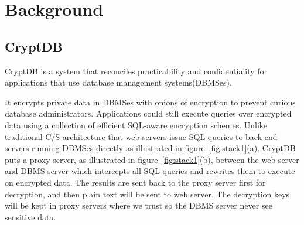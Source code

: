 \section{Background}

\subsection{CryptDB}\label{CryptDB}
CryptDB is a system that reconciles practicability and confidentiality for applications that use database management systems(DBMSes). 

It encrypts private data in DBMSes with onions of encryption to prevent curious database administrators. 
Applications could still execute queries over encrypted data using a collection of efficient SQL-aware encryption schemes. 
Unlike traditional C/S architecture that web servers issue SQL queries to back-end servers running DBMSes directly as illustrated in figure~\ref{fig:stack1}(a). 
CryptDB puts a proxy server, as illustrated in figure~\ref{fig:stack1}(b), between the web server and DBMS server which intercepts all SQL queries and rewrites them to execute on encrypted data. 
The results are sent back to the proxy server first for decryption, and then plain text will be sent to web server. 
The decryption keys will be kept in proxy servers where we trust so the DBMS server never see sensitive data.






